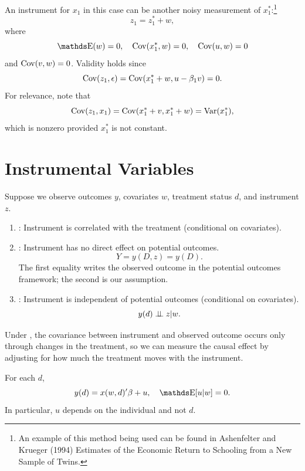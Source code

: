 \documentclass[letterpaper, 10pt]{article}
\begin{document}
An instrument for \(x_1\) in this case can be another noisy measurement of \(x_1^*\):\footnote{An example of this method being used can be found in Ashenfelter and Krueger (1994) Estimates of the Economic Return to Schooling from a New Sample of Twins.}
\[
  z_1 = z_1^* + w,
\]
where
\[
  \E(w) = 0, \quad
  \Cov(x_1^*, w) = 0, \quad
  \Cov(u, w) = 0
\]
and \(\operatorname{Cov}(v, w) = 0\).
Validity holds since
\[
  \operatorname{Cov}(z_1, \epsilon)
  = \operatorname{Cov}(x_1^* + w, u - \beta_1 v)
  = 0.
\]
For relevance, note that
\[
  \operatorname{Cov}(z_1, x_1)
  = \operatorname{Cov}(x_1^* + v, x_1^* + w)
  = \operatorname{Var}(x_1^*),
\]
which is nonzero provided \(x_1^*\) is not constant.


\section{Instrumental Variables}
\begin{assumption}\label{as:IV}
  Suppose we observe outcomes \(y\), covariates \(w\), treatment status \(d\), and instrument \(z\).
  \begin{enumerate}[label=(\roman*)]
    \item {}: Instrument is correlated with the treatment (conditional on covariates).
    \item {}: Instrument has no direct effect on potential outcomes.
      \[
        Y = y(D, z)
        = y(D).
      \]
      The first equality writes the observed outcome in the potential outcomes framework; the second is our assumption.
    \item {}: Instrument is independent of potential outcomes (conditional on covariates).
      \[
        y(d) \perp \!\!\! \perp z | w.
      \]
  \end{enumerate}
\end{assumption}
\begin{remark}
  Under , the covariance between instrument and observed outcome occurs only through changes in the treatment, so we can measure the causal effect by adjusting for how much the treatment moves with the instrument.
\end{remark}

\begin{assumption}\label{as:IV-linear}
  For each \(d\),
  \[
    y(d) = x(w, d)' \beta + u, \quad
    \E[u|w] = 0.
  \]
  In particular, \(u\) depends on the individual and not \(d\).
\end{assumption}
\end{document}
